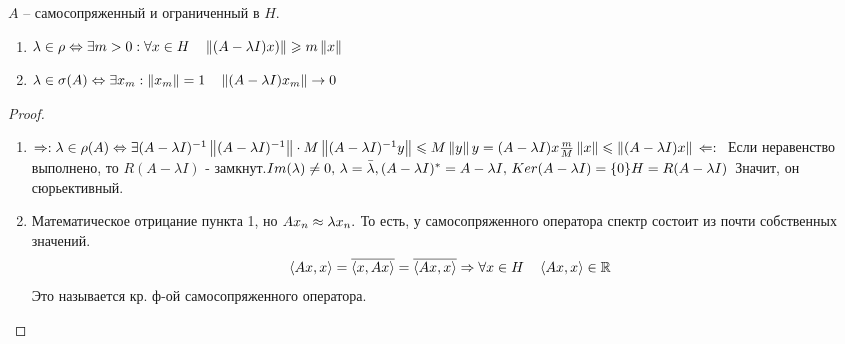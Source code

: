\begin{theorem}
    $A$ -- самосопряженный и ограниченный в $H$.
    \begin{enumerate}
        \item
            $\lambda \in \rho \Leftrightarrow 
            \exists m > 0: \forall x \in H \quad
            \left\|(A - \lambda I)x)\right\| \geqslant m \left\|x\right\|$
        \item
            $\lambda \in \sigma(A) \Leftrightarrow
            \exists x_m: \left\|x_m\right\| = 1 \quad
            \left\|(A - \lambda I)x_m\right\| \rightarrow 0$
    \end{enumerate}
\end{theorem}
\begin{proof}\
    \begin{enumerate}
        \item $\Rightarrow: \\
            \lambda \in \rho (A) \Leftrightarrow \exists (A - \lambda I)^{-1}
            \left\|(A - \lambda I)^{-1}\right\| \cdot M \\
            \left\|(A - \lambda I)^{-1}y\right\| \leqslant M \left\|y\right\| \\
            y = (A - \lambda I)x \\
            \frac{m}{M} \left\|x\right\| \leqslant \left\|(A -\lambda I)x\right\| \\
            \\ \Leftarrow: \\$
            Если неравенство выполнено, то $R(A - \lambda I)$ - замкнут.$\\
            Im(\lambda) \neq 0,\, \lambda = \bar{\lambda},
            (A - \lambda I)^* = A - \lambda I,\,
            Ker(A - \lambda I) = \{0\} \\
            H = R(A - \lambda I)\,$
            Значит, он сюрьективный.
        \item
            Математическое отрицание пункта 1,
            но $Ax_n \approx \lambda x_n. \\$
            То есть, у самосопряженного оператора спектр состоит из почти собственных значений.
            \begin{gather}
                \left\langle Ax , x\right\rangle = \overline{\left\langle x , Ax\right\rangle} =
                \overline {\left\langle Ax , x\right\rangle} \Rightarrow
                \forall x \in H \quad \left\langle Ax , x\right\rangle \in \mathbb{R}
            \end{gather}
            Это называется кр. ф-ой самосопряженного оператора.

    \end{enumerate}
\end{proof}

